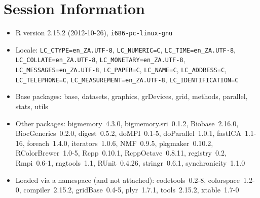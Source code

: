 \documentclass[10pt]{article}
\begin{document}
\section*{Session Information}
\begin{itemize}\raggedright
  \item R version 2.15.2 (2012-10-26), \verb|i686-pc-linux-gnu|
  \item Locale: \verb|LC_CTYPE=en_ZA.UTF-8|, \verb|LC_NUMERIC=C|, \verb|LC_TIME=en_ZA.UTF-8|, \verb|LC_COLLATE=en_ZA.UTF-8|, \verb|LC_MONETARY=en_ZA.UTF-8|, \verb|LC_MESSAGES=en_ZA.UTF-8|, \verb|LC_PAPER=C|, \verb|LC_NAME=C|, \verb|LC_ADDRESS=C|, \verb|LC_TELEPHONE=C|, \verb|LC_MEASUREMENT=en_ZA.UTF-8|, \verb|LC_IDENTIFICATION=C|
  \item Base packages: base, datasets, graphics, grDevices, grid,
    methods, parallel, stats, utils
  \item Other packages: bigmemory~4.3.0, bigmemory.sri~0.1.2,
    Biobase~2.16.0, BiocGenerics~0.2.0, digest~0.5.2, doMPI~0.1-5,
    doParallel~1.0.1, fastICA~1.1-16, foreach~1.4.0, iterators~1.0.6,
    NMF~0.9.5, pkgmaker~0.10.2, RColorBrewer~1.0-5, Rcpp~0.10.1,
    RcppOctave~0.8.11, registry~0.2, Rmpi~0.6-1, rngtools~1.1,
    RUnit~0.4.26, stringr~0.6.1, synchronicity~1.1.0
  \item Loaded via a namespace (and not attached): codetools~0.2-8,
    colorspace~1.2-0, compiler~2.15.2, gridBase~0.4-5, plyr~1.7.1,
    tools~2.15.2, xtable~1.7-0
\end{itemize}
\end{document}
